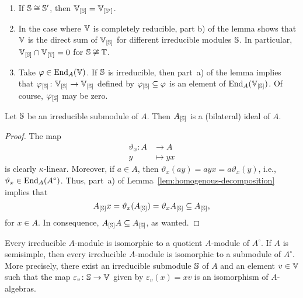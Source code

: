 \begin{rems}\label{rem:homogenous-part}${}$
    \begin{enumerate}[-]
        \item If $\mathbb S\cong\mathbb S'$, then $\mathbb V_{[\mathbb S]}=\mathbb V_{[\mathbb S']}$.

        \item In the case where $\mathbb V$ is completely reducible, part b) of the lemma shows that $\mathbb V$ is the direct sum of $\mathbb V_{[\mathbb S]}$ for different irreducible modules $\mathbb S$. In particular, $\mathbb V_{[\mathbb S]}\cap\mathbb V_{[\mathbb T]}=0$ for $\mathbb S\not\cong\mathbb T$.

        \item Take $\varphi\in {\operatorname{End}}_A(\mathbb V)$. If $\mathbb S$ is irreducible, then part~a) of the lemma implies that $\varphi_{[\mathbb S]}\colon\mathbb V_{[\mathbb S]}\to\mathbb V_{[\mathbb S]}$ defined by $\varphi_{[\mathbb S]}\subseteq\varphi$ is an element of ${\operatorname{End}}_A(\mathbb V_{[\mathbb S]})$. Of course, $\varphi_{[\mathbb S]}$ may be zero.
    \end{enumerate}
\end{rems}

\begin{prop}\label{prop:A[S]-is-ideal}
    Let $\mathbb S$ be an irreducible submodule of $A$. Then  $A_{[\mathbb S]}$ is a (bilateral) ideal of $A$.
\end{prop}

\begin{proof}
        The map
        \begin{align}\label{map:right-homothety}
            \vartheta_x\colon A&\to A\\
            y&\mapsto yx
        \end{align}
        is clearly $\kappa$-linear. Moreover, if $a\in A$, then $\vartheta_x(ay)=ayx=a\vartheta_x(y)$, i.e., $\vartheta_x\in {\operatorname{End}}_A(A^\circ)$. Thus, part~a) of Lemma~\ref{lem:homogenous-decomposition} implies that
        $$
            A_{[\mathbb S]}x = \vartheta_x(A_{[\mathbb S]})
            =\vartheta_xA_{[\mathbb S]}
            \subseteq A_{[\mathbb S]},
        $$
        for $x\in A$. In consequence, $A_{[\mathbb S]}A\subseteq A_{[\mathbb S]}$, as wanted.
\end{proof}

\begin{lem}\label{lem:simple-representatives}
    Every irreducible\/ $A$-module is isomorphic to a quotient $A$-module of\/ $A^\circ$. If\/ $A$ is semisimple, then every irreducible\/ $A$-module is isomorphic to a submodule of\/ $A^\circ$. More precisely, there exist an irreducible submodule $\mathbb S$ of $A$ and an element $v\in\mathbb V$ such that the map $\varepsilon_v\colon\mathbb S\to\mathbb V$ given by $\varepsilon_v(x)=xv$ is an isomorphism of $A$-algebras.
\end{lem}

